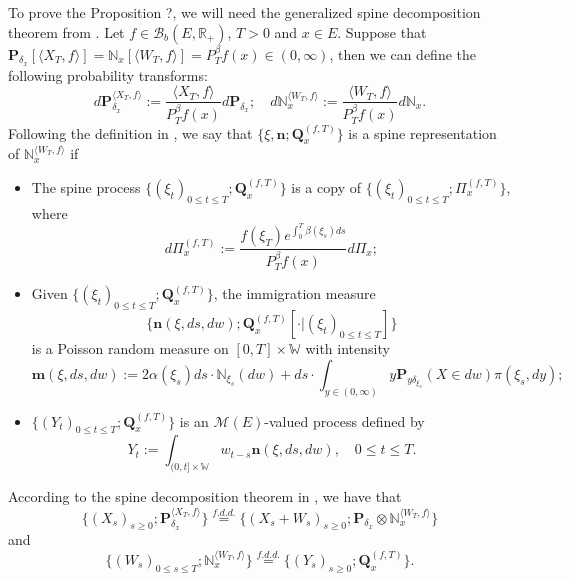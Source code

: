     To prove the Proposition ?, we will need the generalized spine decomposition theorem from \cite{RenSongSun2017Spine}. 
    Let $f\in \mathcal B_b(E,\mathbb R_+)$, $T >0$ and $x\in E$.
    Suppose that $\mathbf P_{\delta_x}[\langle X_T, f\rangle] = \mathbb N_x[\langle W_T, f\rangle] = P^{\beta}_T f(x) \in (0,\infty)$, then we can define the following probability transforms:
\begin{equation}
    d\mathbf P_{\delta_x}^{\langle X_T, f\rangle}
    := \frac{\langle X_T, f\rangle}{P_T^{\beta} f(x)} d\mathbf P_{\delta_x};
    \quad d\mathbb N_x^{\langle W_T, f\rangle}
    :=  \frac{\langle W_T, f\rangle}{P_T^{\beta} f(x)} d\mathbb N_x.
\end{equation}
    Following the definition in \cite{RenSongSun2017Spine}, we say that $\{\xi, \mathbf n;\mathbf Q_{x}^{(f,T)}\}$ is a spine representation of $\mathbb N_x^{\langle W_T, f\rangle}$ if
\begin{itemize}
\item
    The spine process $\{(\xi_t)_{0\leq t\leq T}; \mathbf Q^{(f,T)}_x\}$ is a copy of $\{(\xi_t)_{0\leq t\leq T}; \Pi^{(f,T)}_{x}\}$,
    where
\begin{equation}
    d\Pi_x^{(f,T)} := \frac{f(\xi_T)e^{\int_0^T \beta(\xi_s)ds}}{P^{\beta}_T f(x)} d \Pi_x;
\end{equation}
\item
    Given $\{(\xi_t)_{0\leq t\leq T}; \mathbf Q^{(f,T)}_x\}$, the immigration measure 
\[ \{\mathbf n(\xi,ds,dw); \mathbf Q^{(f,T)}_x[\cdot |(\xi_t)_{0\leq t\leq T}]\}\]
    is a Poisson random measure on $[0,T] \times \mathbb W$ with intensity
\begin{equation}
\label{eq: conditional intensity}
    \mathbf m(\xi,ds,dw)
    := 2 \alpha(\xi_s) ds \cdot \mathbb N_{\xi_s}(dw) + ds \cdot \int_{y\in (0,\infty)} y \mathbf P_{y\delta_{\xi_s}}(X\in dw) \pi(\xi_s,dy);
\end{equation}
\item
    $\{(Y_t)_{0\leq t\leq T}; \mathbf Q^{(f,T)}_x\}$ is an $\mathcal M(E)$-valued process defined by
\begin{equation}
    Y_t
    := \int_{(0,t] \times \mathbb W} w_{t-s} \mathbf n(\xi,ds,dw),
    \quad 0 \leq t\leq T.
\end{equation}
\end{itemize}
    According to the spine decomposition theorem in \cite{RenSongSun2017Spine}, we have that
\begin{equation}
\label{eq: Spine decomposition 1}
    \{(X_s)_{s \geq 0};\mathbf P_{\delta_x}^{\langle X_T, f\rangle}\}
    \overset{f.d.d.}{=} \{(X_s + W_s)_{s \geq 0};\mathbf P_{\delta_x} \otimes \mathbb N_x^{\langle W_T, f\rangle} \}
\end{equation}
    and
\begin{equation}
\label{eq: Spine decomposition 2}
    \{(W_s)_{0\leq s\leq T};\mathbb N_x^{\langle W_T, f\rangle}\}
    \overset{f.d.d.}{=} \{(Y_s)_{s \geq 0};\mathbf Q_x^{(f,T)}\}.
\end{equation}

